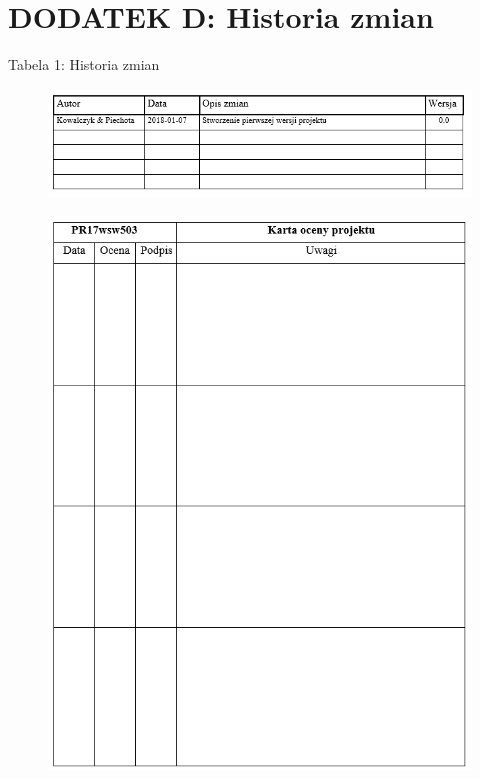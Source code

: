 \section{DODATEK D: Historia zmian}
\label{sub:dodatekD}

\begin{center}
Tabela 1: Historia zmian
\begin{figure}[H]
	\centering
	\includegraphics[scale=0.9]{obrazki/postep}
\end{figure}
\end{center}

\newpage

\begin{center}
\begin{figure}[H]
	\centering
	\includegraphics[scale=1]{obrazki/ocena}
\end{figure}
\end{center}